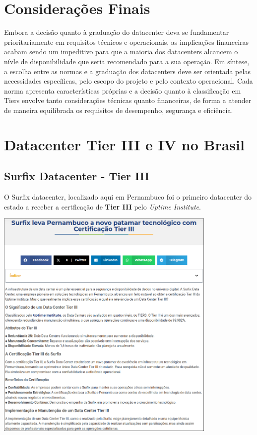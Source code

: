 \documentclass[12pt]{article}
\begin{document}
\section*{Considerações Finais}
Embora a decisão quanto à graduação do datacenter deva se fundamentar prioritariamente em requisitos técnicos e operacionais, as implicações financeiras acabam sendo um impeditivo para que a maioria dos datacenters alcancem o nívle de disponibilidade que seria recomendado para a sua operação.
Em síntese, a escolha entre as normas e a graduação dos datacenters deve ser orientada pelas necessidades específicas, pelo escopo do projeto e pelo contexto operacional. Cada norma apresenta características próprias e a decisão quanto à classificação em Tiers envolve tanto considerações técnicas quanto financeiras, de forma a atender de maneira equilibrada os requisitos de desempenho, segurança e eficiência.

\section*{Datacenter Tier III e IV no Brasil}

\subsection*{Surfix Datacenter - Tier III}O Surfix datacenter, localizado aqui em Pernambuco foi o primeiro datacenter do estado a receber a certficação de \textbf{Tier III} pelo \textit{Uptime Institute}.

\begin{center}
  \includegraphics[width=0.8\textwidth]{surfix_noticia.jpg} 
\end{center}
\end{document}
